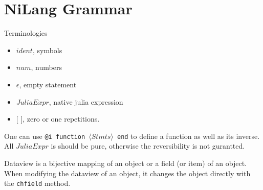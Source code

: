 \documentclass[aps,twocolumn,longbibliography,english,superscriptaddress,prr]{revtex4-1}
\newcommand{\<}{\langle}
\renewcommand{\>}{\rangle}
\theoremstyle{definition}\newtheorem{definition}{\textit{Definition}}
\begin{document}
\pagebreak
\appendix

\section{NiLang Grammar}\label{app:grammar}

Terminologies
\begin{itemize}
    \item $ident$, symbols
    \item $num$, numbers
    \item $\epsilon$, empty statement
    \item $JuliaExpr$, native julia expression
    \item $[$ $]$,  zero or one repetitions.
\end{itemize}

\begin{minipage}{0.3\textwidth}
    \small

\end{minipage}

One can use \texttt{@i function $\<Stmts\>$ end} to define a function as well as its inverse. All $JuliaExpr$ is should be pure, otherwise the reversibility is not gurantted.

Dataview is a bijective mapping of an object or a field (or item) of an object.
When modifying the dataview of an object, it changes the object directly with the \texttt{chfield} method.
\end{document}
